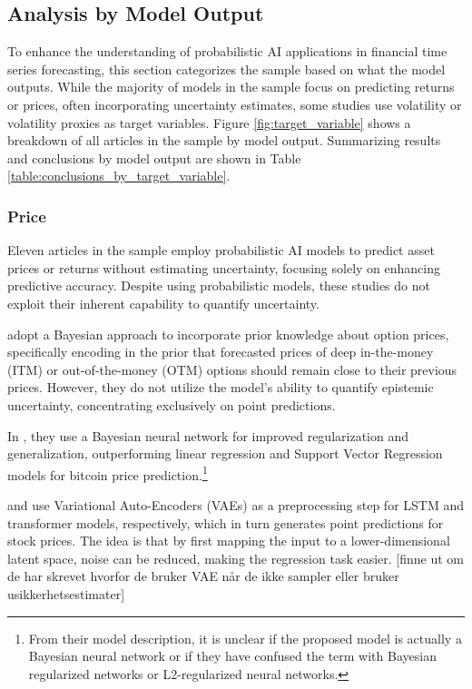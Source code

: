 \subsection{Analysis by Model Output}
To enhance the understanding of probabilistic AI applications in financial time series forecasting, this section categorizes the sample based on what the model outputs. While the majority of models in the sample focus on predicting returns or prices, often incorporating uncertainty estimates, some studies use volatility or volatility proxies as target variables. Figure \ref{fig:target_variable} shows a breakdown of all articles in the sample by model output. Summarizing results and conclusions by model output are shown in Table \ref{table:conclusions_by_target_variable}.

\subsubsection{Price}
Eleven articles in the sample employ probabilistic AI models to predict asset prices or returns without estimating uncertainty, focusing solely on enhancing predictive accuracy. Despite using probabilistic models, these studies do not exploit their inherent capability to quantify uncertainty.

\textcite{jang2018generative} adopt a Bayesian approach to incorporate prior knowledge about option prices, specifically encoding in the prior that forecasted prices of deep in-the-money (ITM) or out-of-the-money (OTM) options should remain close to their previous prices. However, they do not utilize the model's ability to quantify epistemic uncertainty, concentrating exclusively on point predictions.

In \textcite{jang2018empirical}, they use a Bayesian neural network for improved regularization and generalization, outperforming linear regression and Support Vector Regression models for bitcoin price prediction.\footnote{From their model description, it is unclear if the proposed model is actually a Bayesian neural network or if they have confused the term with Bayesian regularized networks or L2-regularized neural networks.}

\textcite{choudhury2020enhancing} and \textcite{tang2024period} use Variational Auto-Encoders (VAEs) as a preprocessing step for LSTM and transformer models, respectively, which in turn generates point predictions for stock prices. The idea is that by first mapping the input to a lower-dimensional latent space, noise can be reduced, making the regression task easier. [finne ut om de har skrevet hvorfor de bruker VAE når de ikke sampler eller bruker usikkerhetsestimater]


